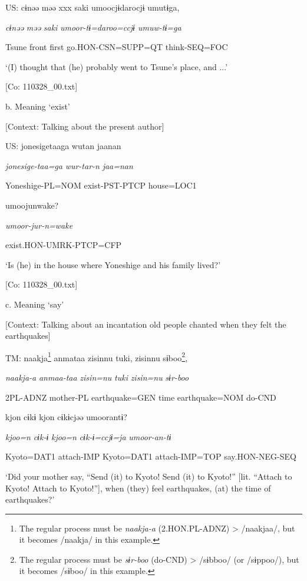     US:  cɨnəə  məə  xxx  saki  umoocjɨdarocjɨ  umutɨga,

      \textit{cɨnəə}  \textit{məə}    \textit{saki}  \textit{umoor{}-tɨ=daroo=ccjɨ  umuw-tɨ=ga}

      Tsune  front    first  go.HON-CSN=SUPP=QT  think-SEQ=FOC

      ‘(I) thought that (he) probably went to Tsune’s place, and ...’

      [Co: 110328\_00.txt]

  b.  Meaning ‘exist’

    [Context: Talking about the present author]

    US:  jonesigetaaga  wutan  jaanan  

      \textit{jonesige-taa=ga}  \textit{wur-tar-n}  \textit{jaa=nan}  

      Yoneshige-PL=NOM  exist-PST-PTCP  house=LOC1  

      umoojunwake?

      \textit{umoor{}-jur-n=wake}

      exist.HON-UMRK-PTCP=CFP

      ‘Is (he) in the house where Yoneshige and his family lived?’

      [Co: 110328\_00.txt]

  c.  Meaning ‘say’

    [Context: Talking about an incantation old people chanted when they felt the earthquakes]

    TM:  naakja\footnote{The regular process must be \textit{naakja-a} (2.HON.PL-ADNZ) > /naakjaa/, but it becomes /naakja/ in this example.}  anmataa  zisinnu  tuki,  zisinnu  sɨboo\footnote{The regular process must be \textit{sɨr-boo} (do-CND) > /sɨbboo/ (or /sɨppoo/), but it becomes /sɨboo/ in this example.},

      \textit{naakja-a}  \textit{anmaa-taa}  \textit{zisin=nu}  \textit{tuki}  \textit{zisin=nu}  \textit{sɨr-boo}

      2PL-ADNZ  mother-PL  earthquake=GEN  time  earthquake=NOM  do-CND

      kjon  cɨkɨ  kjon  cɨkɨcjəə  umoorantɨ?

      \textit{kjoo=n}  \textit{cɨk-ɨ}  \textit{kjoo=n}  \textit{cɨk-ɨ=ccjɨ=ja}  \textit{umoor{}-an-tɨ}

      Kyoto=DAT1  attach-IMP  Kyoto=DAT1  attach-IMP=TOP  say.HON-NEG-SEQ

      ‘Did your mother say, “Send (it) to Kyoto! Send (it) to Kyoto!” [lit. “Attach to Kyoto! Attach to Kyoto!”], when (they) feel earthquakes, (at) the time of earthquakes?’

